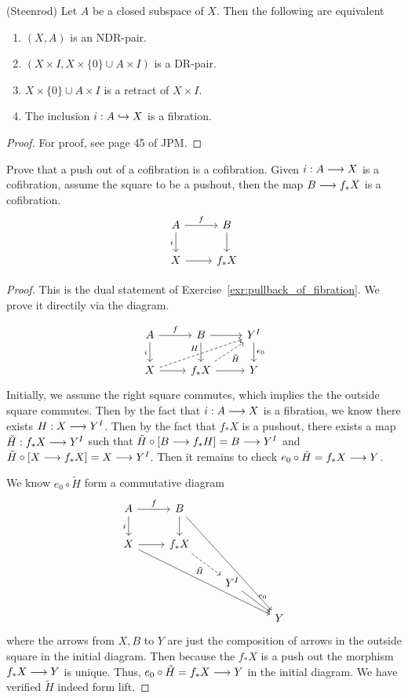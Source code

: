 \documentclass[11pt]{book} %
\begin{document}
\begin{theorem}\label{thm:steenrod}(Steenrod)
Let $A$ be a closed subspace of $X$. Then the following are equivalent
\begin{enumerate}[label=(\roman*)]
\item $(X,A)$ is an NDR-pair.
\item $(X\times I,X\times \{0\}\cup A\times I)$ is a DR-pair.
\item $X\times \{0\}\cup A\times I$ is a retract of $X\times I$.
\item The inclusion $i: A\hookrightarrow X$ is a fibration. 
\end{enumerate}
\end{theorem}
\begin{proof}
For proof, see page 45 of JPM.
\end{proof}


\begin{exr}
Prove that a push out of a cofibration is a cofibration. Given $i: A\longrightarrow X$ is a cofibration, assume the square to be a pushout, then the map $B\longrightarrow f_* X$ is a cofibration.
$$
\begin{tikzcd}
A \arrow[r, "f"] \arrow[d, "i"'] & B \arrow[d] \\
X \arrow[r] & f_*X
\end{tikzcd}
$$
\end{exr}
\begin{proof}
This is the dual statement of Exercise~\ref{exr:pullback_of_fibration}. We prove it directily via the diagram.

$$
\begin{tikzcd}
A \arrow[r, "f"] \arrow[d, "i"'] & B \arrow[d] \arrow[r] & Y^I \arrow[d, "e_0"] \\
X \arrow[r] \arrow[rru, "H", dashed] & f_*X \arrow[r] \arrow[ru, "\tilde{H}"', dashed] & Y
\end{tikzcd}
$$
Initially, we assume the right square commutes, which implies the the outside square commutes.
Then by the fact that $i: A\longrightarrow X$ is a fibration, we know there exists $H:X\longrightarrow Y^I$. Then by the fact that $f_*X$ is a pushout, there exists a map $\tilde{H}:f_*X\longrightarrow Y^I$ such that $\tilde{H}\circ [B\longrightarrow f_*H]=B\longrightarrow Y^I$ and $\tilde{H}\circ [X\longrightarrow f_*X]=X\longrightarrow Y^I$. Then it remains to check $e_0\circ \tilde{H}=f_*X\longrightarrow Y$. 

We know $e_0\circ \tilde{H}$ form a commutative diagram
$$
\begin{tikzcd}
A \arrow[r, "f"] \arrow[d, "i"'] & B \arrow[d] \arrow[rrddd] &  &  \\
X \arrow[r] \arrow[rrrdd] & f_*X \arrow[rd, "\tilde{H}"', dashed] &  &  \\
 &  & Y^I \arrow[rd, "e_0"] &  \\
 &  &  & Y
\end{tikzcd}
$$
where the arrows from $X,B$ to $Y$ are just the composition of arrows in the outside square in the initial diagram. Then because the $f_*X$ is a push out  the morphism $f_*X\longrightarrow Y$ is unique. Thus, $e_0\circ \tilde{H}=f_*X\longrightarrow Y$ in the initial diagram. We have verified $\tilde{H}$ indeed form lift.
\end{proof}
\end{document}
